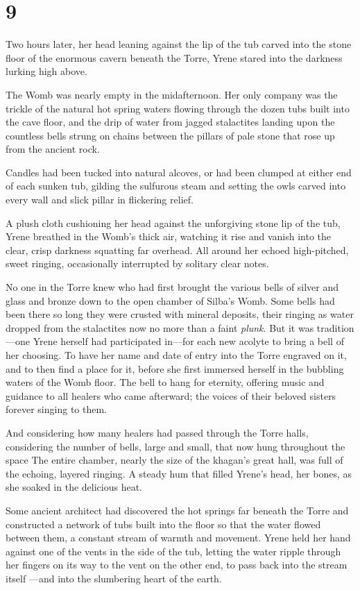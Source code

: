 
\chapter{9}

Two hours later, her head leaning against the lip of the tub carved into the stone floor of the enormous cavern beneath the Torre, Yrene stared into the darkness lurking high above.

The Womb was nearly empty in the midafternoon. Her only company was the trickle of the natural hot spring waters flowing through the dozen tubs built into the cave floor, and the drip of water from jagged stalactites landing upon the countless bells strung on chains between the pillars of pale stone that rose up from the ancient rock.

Candles had been tucked into natural alcoves, or had been clumped at either end of each sunken tub, gilding the sulfurous steam and setting the owls carved into every wall and slick pillar in flickering relief.

A plush cloth cushioning her head against the unforgiving stone lip of the tub, Yrene breathed in the Womb's thick air, watching it rise and vanish into the clear, crisp darkness squatting far overhead. All around her echoed high-pitched, sweet ringing, occasionally interrupted by solitary clear notes.

No one in the Torre knew who had first brought the various bells of silver and glass and bronze down to the open chamber of Silba's Womb. Some bells had been there so long they were crusted with mineral deposits, their ringing as water dropped from the stalactites now no more than a faint \emph{plunk}. But it was tradition ---one Yrene herself had participated in---for each new acolyte to bring a bell of her choosing. To have her name and date of entry into the Torre engraved on it, and to then find a place for it, before she first immersed herself in the bubbling waters of the Womb floor. The bell to hang for eternity, offering music and guidance to all healers who came afterward;
the voices of their beloved sisters forever singing to them.

And considering how many healers had passed through the Torre halls, considering the number of bells, large and small, that now hung throughout the space  The entire chamber, nearly the size of the khagan's great hall, was full of the echoing, layered ringing. A steady hum that filled Yrene's head, her bones, as she soaked in the delicious heat.

Some ancient architect had discovered the hot springs far beneath the Torre and constructed a network of tubs built into the floor so that the water flowed between them, a constant stream of warmth and movement. Yrene held her hand against one of the vents in the side of the tub, letting the water ripple through her fingers on its way to the vent on the other end, to pass back into the stream itself ---and into the slumbering heart of the earth.


